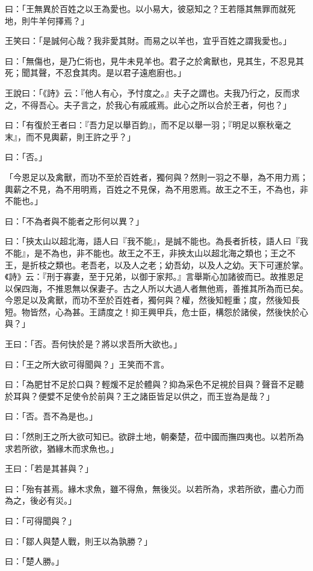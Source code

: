 \documentclass[12pt,a4paper]{ctexbook}
\begin{document}
曰：「王無異於百姓之以王為愛也。以小易大，彼惡知之？王若隱其無罪而就死地，則牛羊何擇焉？」\par
王笑曰：「是誠何心哉？我非愛其財。而易之以羊也，宜乎百姓之謂我愛也。」\par
曰：「無傷也，是乃仁術也，見牛未見羊也。君子之於禽獸也，見其生，不忍見其死；聞其聲，不忍食其肉。是以君子遠庖廚也。」\par
王說曰：「《詩》云：『他人有心，予忖度之。』夫子之謂也。夫我乃行之，反而求之，不得吾心。夫子言之，於我心有戚戚焉。此心之所以合於王者，何也？」\par
曰：「有復於王者曰：『吾力足以舉百鈞』，而不足以舉一羽；『明足以察秋毫之末』，而不見輿薪，則王許之乎？」\par
曰：「否。」\par
「今恩足以及禽獸，而功不至於百姓者，獨何與？然則一羽之不舉，為不用力焉；輿薪之不見，為不用明焉，百姓之不見保，為不用恩焉。故王之不王，不為也，非不能也。」\par
曰：「不為者與不能者之形何以異？」\par
曰：「挾太山以超北海，語人曰『我不能』，是誠不能也。為長者折枝，語人曰『我不能』，是不為也，非不能也。故王之不王，非挾太山以超北海之類也；王之不王，是折枝之類也。老吾老，以及人之老；幼吾幼，以及人之幼。天下可運於掌。《詩》云：『刑于寡妻，至于兄弟，以御于家邦。』言舉斯心加諸彼而已。故推恩足以保四海，不推恩無以保妻子。古之人所以大過人者無他焉，善推其所為而已矣。今恩足以及禽獸，而功不至於百姓者，獨何與？權，然後知輕重；度，然後知長短。物皆然，心為甚。王請度之！抑王興甲兵，危士臣，構怨於諸侯，然後快於心與？」\par
王曰：「否。吾何快於是？將以求吾所大欲也。」\par
曰：「王之所大欲可得聞與？」王笑而不言。\par
曰：「為肥甘不足於口與？輕煖不足於體與？抑為采色不足視於目與？聲音不足聽於耳與？便嬖不足使令於前與？王之諸臣皆足以供之，而王豈為是哉？」\par
曰：「否。吾不為是也。」\par
曰：「然則王之所大欲可知已。欲辟土地，朝秦楚，莅中國而撫四夷也。以若所為求若所欲，猶緣木而求魚也。」\par
王曰：「若是其甚與？」\par
曰：「殆有甚焉。緣木求魚，雖不得魚，無後災。以若所為，求若所欲，盡心力而為之，後必有災。」\par
曰：「可得聞與？」\par
曰：「鄒人與楚人戰，則王以為孰勝？」\par
曰：「楚人勝。」\par
\end{document}
